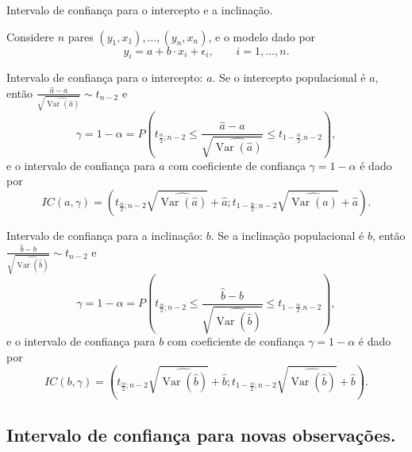 \documentclass[8pt]{beamer}
\DeclareMathOperator{\vari}{Var}
\begin{document}
\begin{frame}{Intervalo de confiança para o intercepto e a inclinação.}

\footnotesize
Considere $n$ pares $(y_1, x_1), \dots, (y_n, x_n)$, e o modelo dado por
$$y_i = a + b \cdot x_i + \epsilon_i, \qquad i =1, \dots, n.$$

\begin{block}{Intervalo de confiança para o intercepto: $a$.}
	Se o intercepto populacional é $a$, então $\frac{\hat{a} - a}{\sqrt{\widehat{\vari\left(\hat{a}\right)}}} \sim t_{n-2}$ e 
	$$\gamma = 1- \alpha = P \left( t_{\frac{\alpha}{2}; n-2} \leq \frac{\hat{a} - a}{\sqrt{\widehat{\vari\left(\hat{a}\right)}}} \leq t_{1-\frac{\alpha}{2}. n-2}  \right),$$
	e o intervalo de confiança para $a$ com coeficiente de confiança $\gamma = 1-\alpha$ é dado por
	$$IC(a, \gamma) =  \left( t_{\frac{\alpha}{2}; n-2} \sqrt{\widehat{\vari({\hat{a}})}} + \hat{a}; t_{1-\frac{\alpha}{2}; n-2} \sqrt{\widehat{\vari({\hat{a}})}} + \hat{a}  \right).$$
\end{block}

\begin{block}{Intervalo de confiança para a inclinação: $b$.}
	Se a inclinação populacional é $b$, então $\frac{\hat{b} - b}{\sqrt{\widehat{\vari\left(\hat{b}\right)}}} \sim t_{n-2}$ e 
	$$\gamma = 1- \alpha = P \left( t_{\frac{\alpha}{2}; n-2} \leq \frac{\hat{b} - b}{\sqrt{\widehat{\vari\left(\hat{b}\right)}}} \leq t_{1-\frac{\alpha}{2}. n-2}  \right),$$
	e o intervalo de confiança para $b$ com coeficiente de confiança $\gamma = 1- \alpha$ é dado por
	$$IC(b, \gamma) = \left( t_{\frac{\alpha}{2}; n-2} \sqrt{\widehat{\vari({\hat{b}})}} + \hat{b}; t_{1-\frac{\alpha}{2}; n-2} \sqrt{\widehat{\vari({\hat{b}})}} + \hat{b}  \right).$$
\end{block}
\normalsize

\end{frame}

\subsection{Intervalo de confiança para novas observações.}
\end{document}

